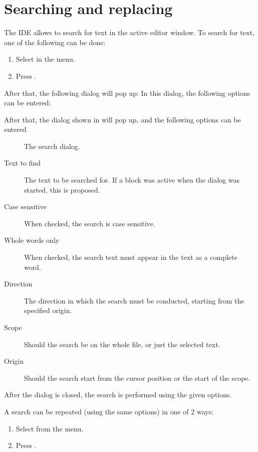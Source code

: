 \section{Searching and replacing}
\label{se:searching}
The IDE allows to search for text in the active editor window. 
To search for text, one  of the following can be done:
\begin{enumerate}
\item Select  in the menu.
\item Press .
\end{enumerate}
\begin{htmlonly}
After that, the following dialog will pop up:
In this dialog, the following options can be entered:
\end{htmlonly}
\begin{latexonly}
After that, the dialog shown in  will pop up,
and the following options can be entered
\begin{figure}[ht]
\caption{The search dialog.}\label{fig:search}
\ifpdf
{}
\else
{}
\fi
\end{figure}
\end{latexonly}

\begin{description}
\item[Text to find] The text to be searched for. If a block was active when
the dialog was started, this is proposed.
\item[Case sensitive] When checked, the search is case sensitive.
\item[Whole words only] When checked, the search text must appear in the
text as a complete word.
\item[Direction] The direction in which the search must be conducted,
starting from the specified origin.
\item[Scope] Should the search be on the whole file, or just the selected
text.
\item[Origin] Should the search start from the cursor position or the start
of the scope.
\end{description}
After the dialog is closed, the search is performed using the given options.

A search can be repeated (using the same options) in one of 2 ways:
\begin{enumerate}
\item Select  from the menu.
\item Press .
\end{enumerate}


